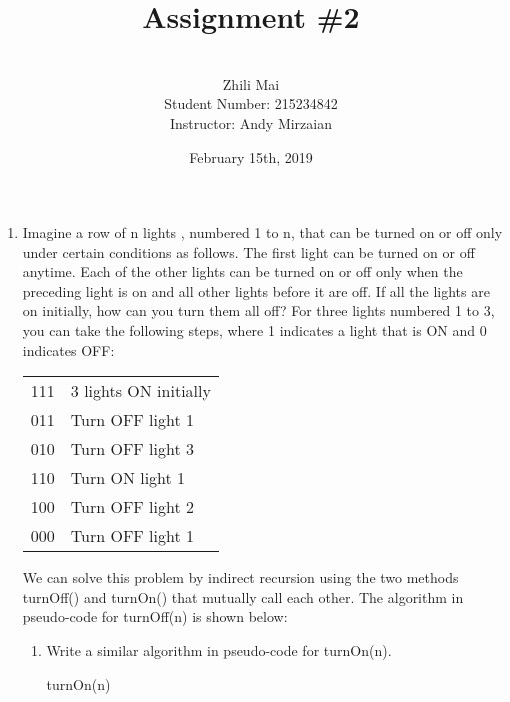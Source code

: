 \documentclass[12pt, a4paper, twoside]{article}
\title{\textbf{Assignment \#2}}
\author{\\Zhili Mai\\Student Number: 215234842\\Instructor: Andy Mirzaian}
\date{February 15th, 2019}
\begin{document}
\begin{titlepage}
\maketitle
\end{titlepage}
\begin{enumerate}
  \item Imagine a row of n lights , numbered 1 to n, that can be turned on or off only under certain conditions as follows. The first light can be turned on or off anytime. Each of the other lights can be turned on or off only when the preceding light is on and all other lights before it are off. If all the lights are on initially, how can you turn them all off? For three lights numbered 1 to 3, you can take the following steps, where 1 indicates a light that is ON and 0 indicates OFF:

  \begin{tabular}{rl}
    111& 3 lights ON initially\\
    011& Turn OFF light 1 \\
    010& Turn OFF light 3 \\
    110& Turn ON light 1 \\
    100& Turn OFF light 2 \\
    000& Turn OFF light 1
  \end{tabular}

  We can solve this problem by indirect recursion using the two methods turnOff() and turnOn() that mutually call each other. The algorithm in pseudo-code for turnOff(n) is shown below:
  \begin{enumerate}[leftmargin=0cm,itemindent=.5cm,labelwidth=\itemindent,labelsep=.2cm,align=left]
  \item Write a similar algorithm in pseudo-code for turnOn(n).

    \begin{algorithm}[H]
    \SetAlgoLined
    \caption{turnOn(n)}
    \end{algorithm}
    \pagebreak


\end{enumerate}
\end{enumerate}
\end{document}
